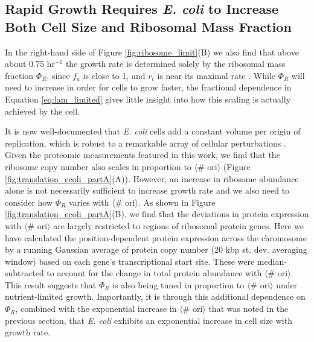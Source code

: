 \subsection{Rapid Growth Requires \textit{E. coli} to Increase Both Cell Size and Ribosomal
Mass Fraction}
In the right-hand side of Figure \ref{fig:ribosome_limit}(B) we also find that above about 0.75
hr$^{-1}$ the growth rate is determined solely by the ribosomal mass fraction
$\Phi_R$, since $f_a$ is close to 1, and $r_t$ is near its maximal rate
\citep{dai2016}. While $\Phi_R$ will need to increase in order for cells to
grow faster, the fractional dependence in Equation \ref{eq:lam_limited}
gives little insight into how this scaling is actually achieved by the cell.

It is now well-documented that \textit{E. coli} cells add a constant volume per
origin of replication, which is robust to a remarkable array of cellular
perturbations \citep{si2017}. Given the proteomic measurements featured in this
work, we find that the ribosome copy number also scales in proportion to
$\langle$\# ori$\rangle$ (Figure \ref{fig:translation_ecoli_partA}(A)). However,  an
increase in ribosome abundance alone is not necessarily sufficient to increase
growth rate and we also need to consider how $\Phi_R$ varies with $\langle$\#
ori$\rangle$. As shown in Figure \ref{fig:translation_ecoli_partA}(B), we find
that the deviations in protein expression with $\langle$\# ori$\rangle$ are
largely restricted to regions of ribosomal protein genes. Here we have calculated the position-dependent
protein expression across the chromosome by a running Gaussian average of
protein copy number (20 kbp st. dev. averaging window) based on each gene's
transcriptional start site. These were median-subtracted to account for the
change in total protein abundance with $\langle$\# ori$\rangle$. This result
suggests that $\Phi_R$ is also being tuned in proportion to $\langle$\#
ori$\rangle$ under nutrient-limited growth. Importantly, it is through this
additional dependence on $\Phi_R$, combined with the exponential increase in
$\langle$\# ori$\rangle$ that was noted in the previous section, that \textit{E. coli}
exhibits an exponential increase in cell size with growth rate.


